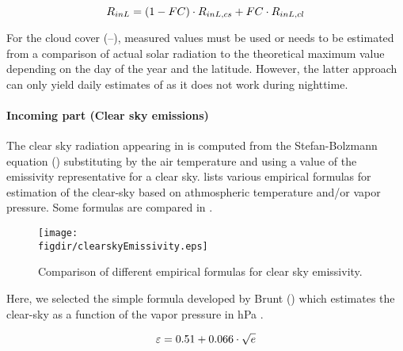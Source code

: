 \begin{equation} \label{eqn:radLongwaveIn}
  R_{inL} = (1-FC) \cdot R_{inL,cs} + FC \cdot R_{inL,cl}
\end{equation}

For the cloud cover \cloudFraction{} (--), measured values must be used or \cloudFraction{} needs to be estimated from a comparison of actual solar radiation to the theoretical maximum value depending on the day of the year and the latitude. However, the latter approach can only yield daily estimates of \cloudFraction{} as it does not work during nighttime.

\paragraph{Incoming part (Clear sky emissions)}
The clear sky radiation \radLongwaveInClearsky{} appearing in  is computed from the Stefan-Bolzmann equation () substituting \temperature{} by the air temperature \airtemp{} and using a value of the emissivity \emissivity{} representative for a clear sky. \citet{Hock2005} lists various empirical formulas for estimation of the clear-sky \emissivity{} based on athmospheric temperature and/or vapor pressure. Some formulas are compared in .

\begin{figure}[htb]
  \centering
  \texttt{[image: \\figdir/clearskyEmissivity.eps]}
  \caption[Comparison of different empirical formulas for clear sky emissivity.]{Comparison of different empirical formulas for clear sky emissivity. \label{fig:clearskyEmissivity}}
\end{figure}

Here, we selected the simple formula developed by Brunt () which estimates the clear-sky \emissivity{} as a function of the vapor pressure \vaporPressure{} in hPa \citep[see][p.373]{Hock2005}.

\begin{equation} \label{eqn:emissivity-brunt}
  \varepsilon = 0.51 + 0.066 \cdot \sqrt{e}
\end{equation}

